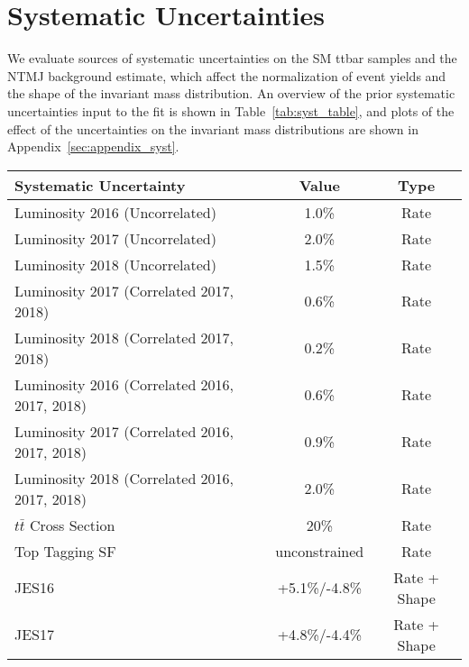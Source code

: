 
\section{Systematic Uncertainties} 
\label{sec:syst}

We evaluate sources of systematic uncertainties on the SM ttbar samples and the NTMJ background estimate, which affect the normalization of event yields and the shape of the invariant mass distribution. An overview of the prior systematic uncertainties input to the fit is shown in Table~\ref{tab:syst_table}, and plots of the effect of the uncertainties on the invariant mass distributions are shown in Appendix~\ref{sec:appendix_syst}.

\begin{table}[!htbp]
    \begin{center}
        \begin{tabular}{lcc}
        Systematic Uncertainty & Value & Type \\
        \hline
            Luminosity 2016 (Uncorrelated)   & 1.0\%                 & Rate         \\
            Luminosity 2017 (Uncorrelated)          & 2.0\%                 & Rate         \\
            Luminosity 2018 (Uncorrelated)          & 1.5\%                 & Rate         \\
	   	 	Luminosity 2017 (Correlated 2017, 2018)			   & 0.6\%                 & Rate         \\
	    	Luminosity 2018 (Correlated 2017, 2018)			   & 0.2\%                 & Rate         \\
            Luminosity 2016 (Correlated 2016, 2017, 2018)		   & 0.6\%                 & Rate         \\
            Luminosity 2017 (Correlated 2016, 2017, 2018)		   & 0.9\%                 & Rate         \\
            Luminosity 2018 (Correlated 2016, 2017, 2018)		   & 2.0\%                 & Rate         \\
            $t\bar{t}$ Cross Section                          & 20\%                  & Rate         \\
	   		Top Tagging SF                                      & unconstrained & Rate \\
            JES16                     & +5.1\%/-4.8\% & Rate + Shape \\
            JES17                     & +4.8\%/-4.4\% & Rate + Shape \\

\end{tabular}
\end{center}
\end{table}
